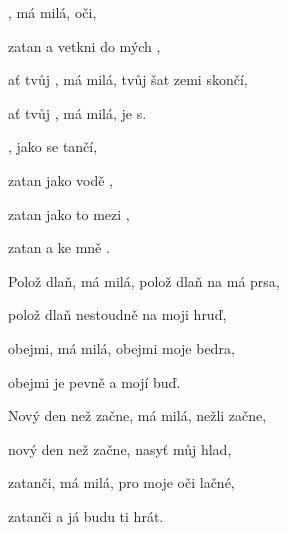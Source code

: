 

\zs
{}, má milá,   oči,

zatan a vetkni  do mých ,

ať tvůj , má milá,  tvůj šat  zemi skončí,

ať tvůj , má milá,  je s.
\ks

\zr
{}, jako se   tančí,

zatan jako  vodě ,

zatan jako to  mezi ,

zatan a  ke mně .
\kr

\zs
Polož dlaň, má milá, polož dlaň na má prsa,

polož dlaň nestoudně na moji hruď,

obejmi, má milá, obejmi moje bedra,

obejmi je pevně a mojí buď.
\ks

\zr  \kr

\zs
Nový den než začne, má milá, nežli začne,

nový den než začne, nasyť můj hlad,

zatanči, má milá, pro moje oči lačné,

zatanči a já budu ti hrát.
\ks

\zr  \kr

\zr  \kr

\kp





